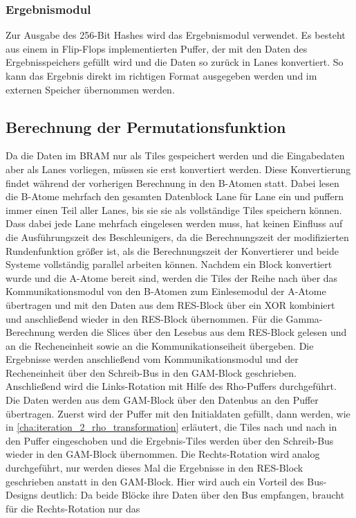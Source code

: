 \subsubsection{Ergebnismodul}
Zur Ausgabe des 256-Bit Hashes wird das Ergebnismodul verwendet. Es besteht aus einem in Flip-Flops implementierten Puffer,
der mit den Daten des Ergebnisspeichers gefüllt wird und die Daten so zurück in Lanes konvertiert.
So kann das Ergebnis direkt im richtigen Format ausgegeben werden und im externen Speicher übernommen werden.

\subsection{Berechnung der Permutationsfunktion}
Da die Daten im BRAM nur als Tiles gespeichert werden und die Eingabedaten aber als Lanes vorliegen, müssen sie erst konvertiert werden.
Diese Konvertierung findet während der vorherigen Berechnung in den B-Atomen statt.
Dabei lesen die B-Atome mehrfach den gesamten Datenblock Lane für Lane ein und puffern immer einen Teil aller Lanes, bis sie sie als vollständige Tiles speichern können.
Dass dabei jede Lane mehrfach eingelesen werden muss, hat keinen Einfluss auf die Ausführungszeit des Beschleunigers, da die Berechnungszeit der modifizierten Rundenfunktion größer ist,
als die Berechnungszeit der Konvertierer und beide Systeme vollständig parallel arbeiten können.
Nachdem ein Block konvertiert wurde und die A-Atome bereit sind, werden die Tiles der Reihe nach über das Kommunikationsmodul von den B-Atomen zum Einlesemodul der A-Atome übertragen
und mit den Daten aus dem RES-Block über ein XOR kombiniert und anschließend wieder in den RES-Block übernommen.
Für die Gamma-Berechnung werden die Slices über den Lesebus aus dem RES-Block gelesen und an die Recheneinheit sowie an die Kommunikationseiheit übergeben.
Die Ergebnisse werden anschließend vom Kommunikationsmodul und der Recheneinheit über den Schreib-Bus in den GAM-Block geschrieben.
Anschließend wird die Links-Rotation mit Hilfe des Rho-Puffers durchgeführt. Die Daten werden aus dem GAM-Block über den Datenbus an den Puffer übertragen.
Zuerst wird der Puffer mit den Initialdaten gefüllt, dann werden, wie in \ref{cha:iteration_2_rho_transformation} erläutert, die Tiles nach und nach in den Puffer eingeschoben
und die Ergebnis-Tiles werden über den Schreib-Bus wieder in den GAM-Block übernommen.
Die Rechts-Rotation wird analog durchgeführt, nur werden dieses Mal die Ergebnisse in den RES-Block geschrieben anstatt in den GAM-Block.
Hier wird auch ein Vorteil des Bus-Designs deutlich: Da beide Blöcke ihre Daten über den Bus empfangen, braucht für die Rechts-Rotation nur das
